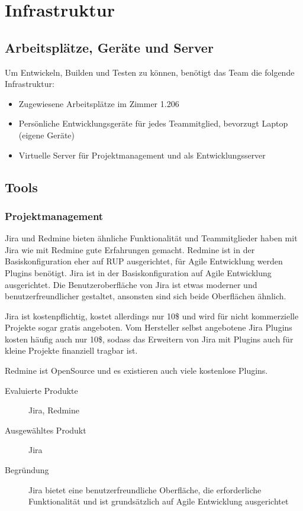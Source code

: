\chapter{Infrastruktur}	

	\section{Arbeitsplätze, Geräte und Server}
		Um Entwickeln, Builden und Testen zu können, benötigt das Team die folgende Infrastruktur:
		\begin{itemize}
			\setlength{\itemsep}{-\parsep}
			\item Zugewiesene Arbeitsplätze im Zimmer 1.206
			\item Persönliche Entwicklungsgeräte für jedes Teammitglied, bevorzugt Laptop (eigene Geräte)
			\item Virtuelle Server für Projektmanagement und als Entwicklungsserver
		\end{itemize}

		
	\section{Tools}
		\subsection{Projektmanagement}	
			Jira und Redmine bieten ähnliche Funktionalität und Teammitglieder haben mit Jira wie mit Redmine gute Erfahrungen gemacht. 
			Redmine ist in der Basiskonfiguration eher auf RUP ausgerichtet, für Agile Entwicklung werden Plugins benötigt. 
			Jira ist in der Basiskonfiguration auf Agile Entwicklung ausgerichtet. 
			Die Benutzeroberfläche von Jira ist etwas moderner und benutzerfreundlicher gestaltet, ansonsten sind sich beide Oberflächen ähnlich. 
			
			Jira ist kostenpflichtig, kostet allerdings nur 10\$ \cite{atlassan_jira_2014} und wird für nicht kommerzielle Projekte sogar gratis angeboten.
			Vom Hersteller selbst angebotene Jira Plugins kosten häufig auch nur 10\$, 
			sodass das Erweitern von Jira mit Plugins auch für kleine Projekte finanziell tragbar ist.
			
			Redmine ist OpenSource und es existieren auch viele kostenlose Plugins.
		
			\begin{description}
				\item[Evaluierte Produkte] Jira, Redmine
				\item[Ausgewähltes Produkt] Jira
				\item[Begründung] Jira bietet eine benutzerfreundliche Oberfläche, die erforderliche Funktionalität und ist grundsätzlich auf Agile Entwicklung ausgerichtet
			\end{description}


